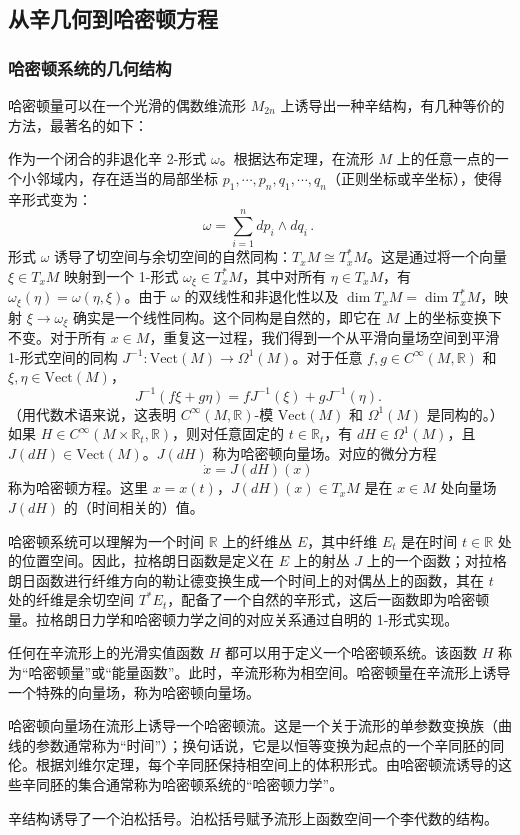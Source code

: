\subsection{从辛几何到哈密顿方程}
\subsubsection{哈密顿系统的几何结构}
哈密顿量可以在一个光滑的偶数维流形 \( M_{2n} \) 上诱导出一种辛结构，有几种等价的方法，最著名的如下：

作为一个闭合的非退化辛 2-形式 \( \omega \)。根据达布定理，在流形 \( M \) 上的任意一点的一个小邻域内，存在适当的局部坐标 \( p_{1}, \cdots, p_{n}, q_{1}, \cdots, q_{n} \)（正则坐标或辛坐标），使得辛形式变为：
\[
\omega = \sum_{i=1}^{n} dp_{i} \wedge dq_{i} \,.~
\]
形式 \( \omega \) 诱导了切空间与余切空间的自然同构：\( T_x M \cong T_x^* M \)。这是通过将一个向量 \( \xi \in T_x M \) 映射到一个 1-形式 \( \omega_\xi \in T_x^* M \)，其中对所有 \( \eta \in T_x M \)，有 \( \omega_\xi(\eta) = \omega(\eta, \xi) \)。由于 \( \omega \) 的双线性和非退化性以及 \( \dim T_x M = \dim T_x^* M \)，映射 \( \xi \to \omega_\xi \) 确实是一个线性同构。这个同构是自然的，即它在 \( M \) 上的坐标变换下不变。对于所有 \( x \in M \)，重复这一过程，我们得到一个从平滑向量场空间到平滑 1-形式空间的同构 \( J^{-1}: \text{Vect}(M) \to \Omega^1(M) \)。对于任意 \( f, g \in C^{\infty}(M, \mathbb{R}) \) 和 \( \xi, \eta \in \text{Vect}(M) \)，
\[
J^{-1}(f \xi + g \eta) = f J^{-1}(\xi) + g J^{-1}(\eta).~
\]
（用代数术语来说，这表明 \( C^{\infty}(M, \mathbb{R}) \)-模 \( \text{Vect}(M) \) 和 \( \Omega^1(M) \) 是同构的。）如果 \( H \in C^{\infty}(M \times \mathbb{R}_t, \mathbb{R}) \)，则对任意固定的 \( t \in \mathbb{R}_t \)，有 \( dH \in \Omega^1(M) \)，且 \( J(dH) \in \text{Vect}(M) \)。\( J(dH) \) 称为哈密顿向量场。对应的微分方程
\[
\dot{x} = J(dH)(x)~
\]
称为哈密顿方程。这里 \( x = x(t) \)，\( J(dH)(x) \in T_x M \) 是在 \( x \in M \) 处向量场 \( J(dH) \) 的（时间相关的）值。

哈密顿系统可以理解为一个时间 \( \mathbb{R} \) 上的纤维丛 \( E \)，其中纤维 \( E_t \) 是在时间 \( t \in \mathbb{R} \) 处的位置空间。因此，拉格朗日函数是定义在 \( E \) 上的射丛 \( J \) 上的一个函数；对拉格朗日函数进行纤维方向的勒让德变换生成一个时间上的对偶丛上的函数，其在 \( t \) 处的纤维是余切空间 \( T^* E_t \)，配备了一个自然的辛形式，这后一函数即为哈密顿量。拉格朗日力学和哈密顿力学之间的对应关系通过自明的 1-形式实现。

任何在辛流形上的光滑实值函数 \( H \) 都可以用于定义一个哈密顿系统。该函数 \( H \) 称为“哈密顿量”或“能量函数”。此时，辛流形称为相空间。哈密顿量在辛流形上诱导一个特殊的向量场，称为哈密顿向量场。

哈密顿向量场在流形上诱导一个哈密顿流。这是一个关于流形的单参数变换族（曲线的参数通常称为“时间”）；换句话说，它是以恒等变换为起点的一个辛同胚的同伦。根据刘维尔定理，每个辛同胚保持相空间上的体积形式。由哈密顿流诱导的这些辛同胚的集合通常称为哈密顿系统的“哈密顿力学”。

辛结构诱导了一个泊松括号。泊松括号赋予流形上函数空间一个李代数的结构。